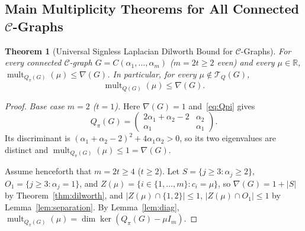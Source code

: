 \documentclass[11pt,a4paper]{article}
\newtheorem{theorem}{Theorem}[section]
\theoremstyle{definition}
\DeclareMathOperator{\mult}{mult}
\begin{document}
\subsection{Main Multiplicity Theorems for All Connected $\mathcal{C}$-Graphs}

\begin{theorem}[Universal Signless Laplacian Dilworth Bound for $\mathcal{C}$-Graphs]\label{thm:CgraphQ}
  For every connected $\mathcal{C}$-graph $G = C(\alpha_1,\dots,\alpha_m)$ ($m = 2t \ge 2$ even) and every $\mu \in \mathbb{R}$, $\mult_{Q_\pi(G)}(\mu) \le \nabla(G)$. In particular, for every $\mu \notin \mathcal{T}_Q(G)$,
  \[
    \mult_{Q(G)}(\mu) \le \nabla(G).
  \]
\end{theorem}

\begin{proof}
  \emph{Base case $m = 2$ ($t = 1$).} Here $\nabla(G) = 1$ and~\eqref{eq:Qpi} gives
  \[
    Q_\pi(G) = \begin{pmatrix} 2\alpha_1 + \alpha_2 - 2 & \alpha_2 \\ \alpha_1 & \alpha_1 \end{pmatrix}.
  \]
  Its discriminant is $(\alpha_1 + \alpha_2 - 2)^2 + 4\alpha_1\alpha_2 > 0$, so its two eigenvalues are distinct and $\mult_{Q_\pi(G)}(\mu) \le 1 = \nabla(G)$.

  Assume henceforth that $m = 2t \ge 4$ ($t \ge 2$). Let $S = \{j \ge 3 : \alpha_j \ge 2\}$, $O_1 = \{j \ge 3 : \alpha_j = 1\}$, and $Z(\mu) = \{i \in \{1,\dots,m\} : c_i = \mu\}$, so $\nabla(G) = 1 + |S|$ by Theorem~\ref{thm:dilworth}, and $|Z(\mu) \cap \{1,2\}| \le 1$, $|Z(\mu) \cap O_1| \le 1$ by Lemma~\ref{lem:separation}. By Lemma~\ref{lem:diag}, $\mult_{Q_\pi(G)}(\mu) = \dim\ker(Q_\pi(G) - \mu I_m)$.


\end{proof}
\end{document}
